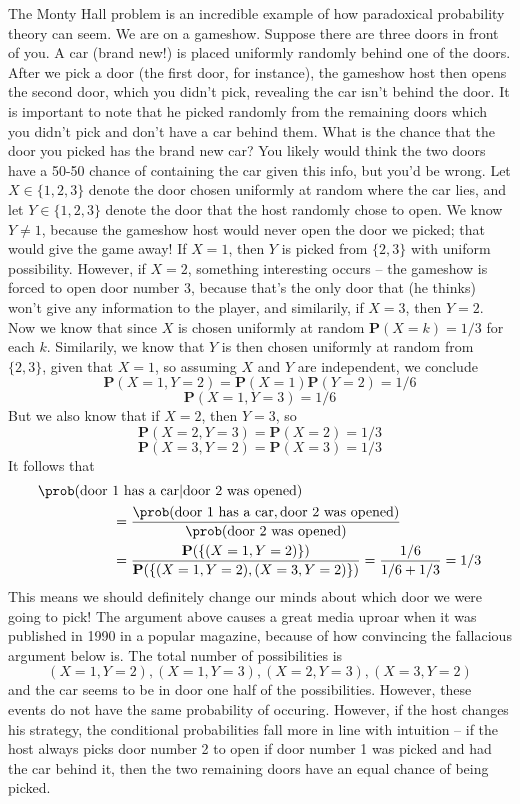 \begin{example}
    The Monty Hall problem is an incredible example of how paradoxical probability theory can seem. We are on a gameshow. Suppose there are three doors in front of you. A car (brand new!) is placed uniformly randomly behind one of the doors. After we pick a door (the first door, for instance), the gameshow host then opens the second door, which you didn't pick, revealing the car isn't behind the door. It is important to note that he picked randomly from the remaining doors which you didn't pick and don't have a car behind them. What is the chance that the door you picked has the brand new car? You likely would think the two doors have a 50-50 chance of containing the car given this info, but you'd be wrong. Let $X \in \{ 1, 2, 3 \}$ denote the door chosen uniformly at random where the car lies, and let $Y \in \{ 1, 2, 3 \}$ denote the door that the host randomly chose to open. We know $Y \neq 1$, because the gameshow host would never open the door we picked; that would give the game away! If $X = 1$, then $Y$ is picked from $\{ 2, 3 \}$ with uniform possibility. However, if $X = 2$, something interesting occurs -- the gameshow is forced to open door number $3$, because that's the only door that (he thinks) won't give any information to the player, and similarily, if $X = 3$, then $Y = 2$. Now we know that since $X$ is chosen uniformly at random $\mathbf{P}(X = k) = 1/3$ for each $k$. Similarily, we know that $Y$ is then chosen uniformly at random from $\{ 2, 3 \}$, given that $X = 1$, so assuming $X$ and $Y$ are independent, we conclude
    \[ \mathbf{P}(X = 1, Y = 2) = \mathbf{P}(X = 1) \mathbf{P}(Y = 2) = 1/6 \]
    \[ \mathbf{P}(X = 1, Y = 3) = 1/6 \]
    But we also know that if $X = 2$, then $Y = 3$, so
    \[ \mathbf{P}(X = 2, Y = 3) = \mathbf{P}(X = 2) = 1/3 \]
    \[ \mathbf{P}(X = 3, Y = 2) = \mathbf{P}(X = 3) = 1/3 \]
    It follows that
    \begin{align*}
        \prob(\text{door}\ &1\ \text{has a car} | \text{door}\ 2\ \text{was opened})\\
        &= \frac{\prob(\text{door}\ 1\ \text{has a car}, \text{door}\ 2\ \text{was opened})}{\prob(\text{door 2 was opened})}\\
        &= \frac{\mathbf{P}(\{ (X = 1,Y = 2) \})}{\mathbf{P}( \{ (X = 1,Y = 2), (X = 3,Y = 2) \} )} = \frac{1/6}{1/6 + 1/3} = 1/3
    \end{align*}
    This means we should definitely change our minds about which door we were going to pick! The argument above causes a great media uproar when it was published in 1990 in a popular magazine, because of how convincing the fallacious argument below is. The total number of possibilities is
    \[ (X = 1,Y = 2),(X = 1,Y = 3),(X = 2,Y = 3),(X = 3,Y = 2) \]
    and the car seems to be in door one half of the possibilities. However, these events do not have the same probability of occuring. However, if the host changes his strategy, the conditional probabilities fall more in line with intuition -- if the host always picks door number 2 to open if door number 1 was picked and had the car behind it, then the two remaining doors have an equal chance of being picked.
\end{example}

